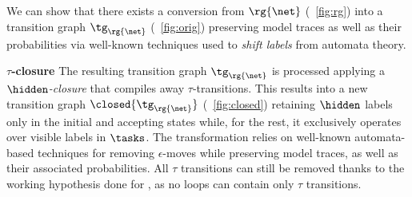 

%
%

We can show that there exists a conversion from $\rg{\net}$ (\figurename~\ref{fig:rg}) into a transition graph $\tg_{\rg{\net}}$ (\figurename~\ref{fig:orig}) preserving model traces as well as their probabilities via well-known techniques used to \emph{shift labels} from automata theory.  

\textbf{$\tau$-closure} The resulting transition graph $\tg_{\rg{\net}}$ is processed applying a \emph{$\hidden$-closure} that compiles away
$\tau$-transitions. This results into a new transition graph $\closed{\tg_{\rg{\net}}}$ (\figurename~\ref{fig:closed}) %
retaining $\hidden$ labels only in the initial and accepting states while, for the rest, it exclusively operates over visible labels in $\tasks$. %
The transformation relies on well-known automata-based techniques for removing $\epsilon$-moves while preserving model traces, as well as their associated probabilities. %
All $\tau$ transitions can still be removed thanks to the working hypothesis done for , as no loops can contain only $\tau$ transitions. %


